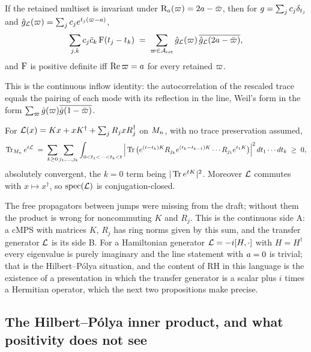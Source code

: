 \begin{theorem}
\label{thm:weil-line-duality}
If the retained multiset is invariant under $\mathrm{R}_{a}(\varpi) = 2a-\bar{\varpi}$, then
for $g = \sum_jc_j\delta_{t_j}$ and $\hat g_{\mathcal L}(\varpi) = \sum_jc_je^{t_j(\varpi-a)}$,
\[
  \sum_{j,k}c_j\bar c_k\,\mathrm{F}(t_j-t_k)
  \;=\; \sum_{\varpi\in\mathcal A_{\mathrm{ret}}}\hat g_{\mathcal L}(\varpi)\,\overline{\hat g_{\mathcal L}(2a-\bar{\varpi})} ,
\]
and $\mathrm{F}$ is positive definite iff $\operatorname{Re}\varpi = a$ for every retained $\varpi$.
\end{theorem}

This is the continuous inflow identity: the autocorrelation of the rescaled trace equals
the pairing of each mode with its reflection in the line, Weil's form in the form
$\sum_\varpi\hat g(\varpi)\overline{\hat g(1-\bar{\varpi})}$.

\begin{theorem}
\label{thm:cmps-ring-norms}
For $\mathcal L(x) = Kx+xK^\dagger+\sum_jR_jxR_j^\dagger$ on $M_n$, with no trace
preservation assumed,
\[
  \operatorname{Tr}\nolimits_{M_n}e^{t\mathcal L} \;=\; \sum_{k\ge0}\sum_{j_1,\dots,j_k}
  \int_{0<t_1<\dots<t_k<t}
  \Big|\operatorname{Tr}\big(e^{(t-t_k)K}R_{j_k}e^{(t_k-t_{k-1})K}\cdots R_{j_1}e^{t_1K}\big)\Big|^2
  \,dt_1\cdots dt_k \;\ge\;0,
\]
absolutely convergent, the $k = 0$ term being $|\operatorname{Tr} e^{t K}|^2$. Moreover $\mathcal L$
commutes with $x\mapsto x^\dagger$, so $\operatorname{spec}(\mathcal L)$ is conjugation-closed.
\end{theorem}

The free propagators between jumps were missing from the draft; without them the product
is wrong for noncommuting $K$ and $R_j$. This is the continuous side A: a cMPS with
matrices $K$, $R_j$ has ring norms given by this sum, and the transfer generator $\mathcal L$
is its side B. For a Hamiltonian generator $\mathcal L = -i[H,\cdot]$ with $H = H^\dagger$ every
eigenvalue is purely imaginary and the line statement with $a = 0$ is trivial; that is
the Hilbert--P\'olya situation, and the content of RH in this language is the existence of
a presentation in which the transfer generator is a scalar plus $i$ times a Hermitian
operator, which the next two propositions make precise.

\subsection{The Hilbert--P\'olya inner product, and what positivity does not see}

